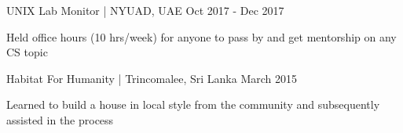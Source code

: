 

\begin{cventries}

    \project
        {UNIX Lab Monitor | NYUAD, UAE}
        {Oct 2017 - Dec 2017}
        {\begin{cvitems}
        \item Held office hours (10 hrs/week) for anyone to pass by and get mentorship on any CS topic
        \end{cvitems}}

    \project
        {Habitat For Humanity | Trincomalee, Sri Lanka}
        {March 2015}
        {\begin{cvitems}
        \item Learned to build a house in local style from the community and subsequently assisted in the process
        \end{cvitems}}



\end{cventries}
